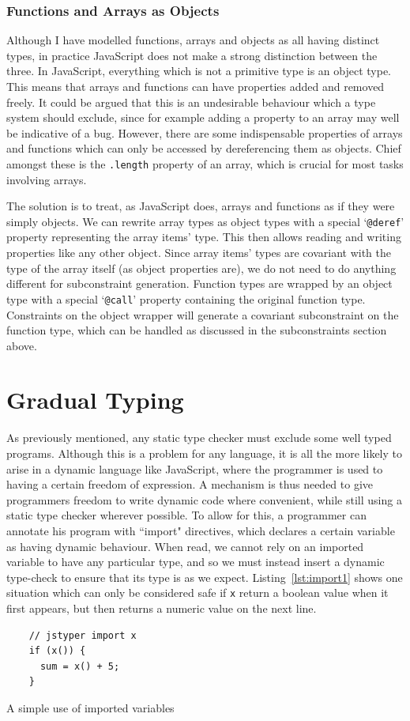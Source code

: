 \documentclass[12pt,a4paper,twoside,openright]{report}
\theoremstyle{definition}
\theoremstyle{dotless}
\newcommand*{\js}{\texttt}
\begin{document}
\subsubsection*{Functions and Arrays as Objects}

Although I have modelled functions, arrays and objects as all having distinct
types, in practice JavaScript does not make a strong distinction between the
three. In JavaScript, everything which is not a primitive type is an object
type. This means that arrays and functions can have properties added and
removed freely. It could be argued that this is an undesirable behaviour which
a type system should exclude, since for example adding a property to an array
may well be indicative of a bug. However, there are some indispensable
properties of arrays and functions which can only be accessed by dereferencing
them as objects. Chief amongst these is the \js{.length} property of an array,
which is crucial for most tasks involving arrays.

The solution is to treat, as JavaScript does, arrays and functions as if they
were simply objects. We can rewrite array types as object types with a special
`\texttt{@deref}' property representing the array items' type. This then allows
reading and writing properties like any other object. Since array items' types
are covariant with the type of the array itself (as object properties are), we
do not need to do anything different for subconstraint generation. Function
types are wrapped by an object type with a special `\texttt{@call}' property
containing the original function type. Constraints on the object wrapper will
generate a covariant subconstraint on the function type, which can be handled
as discussed in the subconstraints section above.

\section{Gradual Typing}

As previously mentioned, any static type checker must exclude some well typed
programs.  Although this is a problem for any language, it is all the more
likely to arise in a dynamic language like JavaScript, where the programmer is
used to having a certain freedom of expression. A mechanism is thus needed to
give programmers freedom to write dynamic code where convenient, while still
using a static type checker wherever possible. To allow for this, a programmer
can annotate his program with ``import" directives, which declares a certain
variable as having dynamic behaviour. When read, we cannot rely on an imported
variable to have any particular type, and so we must instead insert a dynamic
type-check to ensure that its type is as we expect.
Listing~\ref{lst:import1} shows one situation which can only be considered safe if
\js{x} return a boolean value when it first appears, but then returns a numeric value on
the next line. 
\begin{program}
  \begin{verbatim}
	// jstyper import x
	if (x()) {
	  sum = x() + 5;
	}
  \end{verbatim}
  \caption{A simple use of imported variables}\label{lst:import1}
\end{program}
\end{document}
